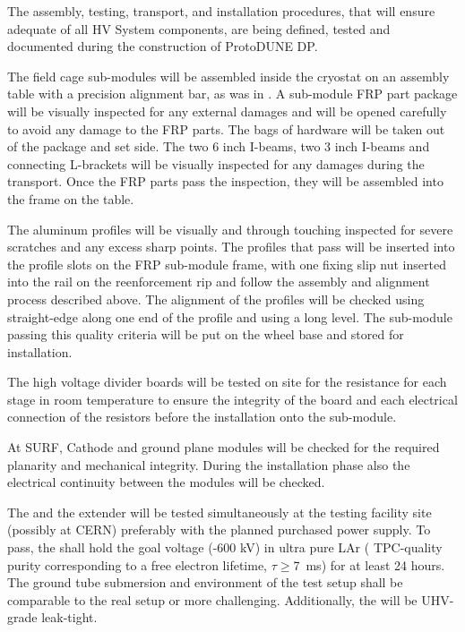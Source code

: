 The assembly, testing, transport, and installation procedures, that will ensure adequate  of all HV System components, are being defined, tested and documented during the construction of ProtoDUNE DP.

The field cage sub-modules will be assembled inside the cryostat on an assembly table with a precision alignment bar, as was in .  A sub-module FRP part package will be visually inspected for any external damages and will be opened carefully to avoid any damage to the FRP parts.  The bags of hardware will be taken out of the package and set side.   The two 6 inch I-beams, two 3 inch I-beams and connecting L-brackets will be visually inspected for any damages during the transport.  Once the FRP parts pass the inspection, they will be assembled into the frame on the table.  

The aluminum profiles will be visually and through touching inspected for severe scratches and any excess sharp points.  The profiles that pass will be inserted into the profile slots on the FRP sub-module frame, with one fixing slip nut inserted into the rail on the reenforcement rip and follow the assembly and alignment process described above.  The alignment of the profiles will be checked using straight-edge along one end of the profile and using a long level.  The sub-module passing this quality criteria will be put on the wheel base and stored for installation.

The high voltage divider boards will be tested on site for the resistance for each stage in room temperature to ensure the integrity of the board and each electrical connection of the resistors before the installation onto the sub-module. 


At SURF, Cathode and ground plane modules will be checked for the required planarity and mechanical integrity. During the installation phase also the electrical continuity between the modules will be checked.

The \fdth and the \hv extender will be tested simultaneously at the testing facility  site (possibly at CERN) preferably with the planned purchased power supply.  To pass, the \fdth shall hold the goal voltage (-600 kV) in ultra pure LAr ( TPC-quality purity corresponding to a free electron lifetime, $\tau\geq$\SI{7}{\ms}) for at least \num{24} hours. The ground tube submersion and \efield environment of the test setup shall be comparable to the real \fc setup or more challenging.  Additionally, the \fdth will be UHV-grade leak-tight.

